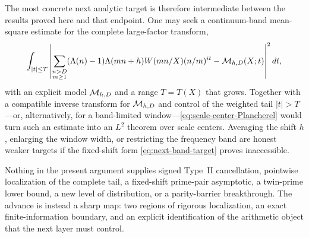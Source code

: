 The most concrete next analytic target is therefore intermediate between
the results proved here and that endpoint.  One may seek a continuum-band
mean-square estimate for the complete large-factor transform,
\begin{equation}\label{eq:next-band-target}
 \int_{|t|\leq T}
 \left|
  \sum_{\substack{n>D\\m\geq1}}
  (\Lambda(n)-1)\Lambda(mn+h)W(mn/X)(n/m)^{it}
  -\mathcal M_{h,D}(X;t)
 \right|^2dt,
\end{equation}
with an explicit model $\mathcal M_{h,D}$ and a range $T=T(X)$ that grows.
Together with a compatible inverse transform for $\mathcal M_{h,D}$ and control
of the weighted tail $|t|>T$---or, alternatively, for a band-limited
window---\eqref{eq:scale-center-Plancherel} would turn such an estimate into
an $L^2$ theorem over scale centers.  Averaging the shift $h$, enlarging
the window width, or restricting the frequency band are honest weaker
targets if the fixed-shift form \eqref{eq:next-band-target} proves
inaccessible.

Nothing in the present argument supplies signed Type~II cancellation,
pointwise localization of the complete tail, a fixed-shift prime-pair
asymptotic, a twin-prime lower bound, a new level of distribution, or a
parity-barrier breakthrough.  The advance is instead a sharp map: two
regions of rigorous localization, an exact finite-information boundary,
and an explicit identification of the arithmetic object that the next
layer must control.

